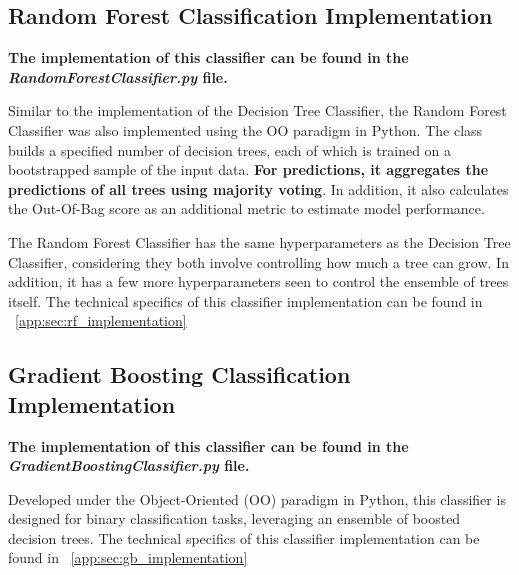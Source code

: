 \subsection{Random Forest Classification Implementation}

\textbf{The implementation of this classifier can be found in the \textit{RandomForestClassifier.py} file.}

Similar to the implementation of the Decision Tree Classifier, the Random Forest Classifier was also implemented using the OO paradigm in Python.
The class builds a specified number of decision trees, each of which is trained on a bootstrapped sample of the input data. \textbf{For predictions, it aggregates the predictions of all trees using majority voting}. In addition, it also calculates the Out-Of-Bag score as an additional metric to estimate model performance.

The Random Forest Classifier has the same hyperparameters as the Decision Tree Classifier, considering they both involve controlling how much a tree can grow. In addition, it has a few more hyperparameters seen to control the ensemble of trees itself.
The technical specifics of this classifier implementation can be found in ~\autoref{app:sec:rf_implementation}

\subsection{Gradient Boosting Classification Implementation}

\textbf{The implementation of this classifier can be found in the \textit{GradientBoostingClassifier.py} file.}

Developed under the Object-Oriented (OO) paradigm in Python, this classifier is designed for binary classification tasks, leveraging an ensemble of boosted decision trees.
The technical specifics of this classifier implementation can be found in ~\autoref{app:sec:gb_implementation}





